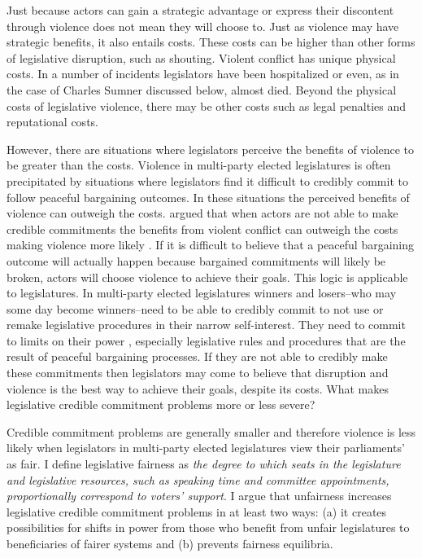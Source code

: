 \documentclass[a4paper]{article}\usepackage[]{graphicx}\usepackage[]{color}
\begin{document}
Just because actors can gain a strategic advantage or express their discontent through violence does not mean they will choose to. Just as violence may have strategic benefits, it also entails costs. These costs can be higher than other forms of legislative disruption, such as shouting. Violent conflict has unique physical costs. In a number of incidents legislators have been hospitalized or even, as in the case of Charles Sumner discussed below, almost died. Beyond the physical costs of legislative violence, there may be other costs such as legal penalties and reputational costs.

However, there are situations where legislators perceive the benefits of violence to be greater than the costs. Violence in multi-party elected legislatures is often precipitated by situations where legislators find it difficult to credibly commit to follow peaceful bargaining outcomes. In these situations the perceived benefits of violence can outweigh the costs. \cite{Fearon1995} argued that when actors are not able to make credible commitments the benefits from violent conflict can outweigh the costs making violence more likely \cite[see also][]{Powell2006}. If it is difficult to believe that a peaceful bargaining outcome will actually happen because bargained commitments will likely be broken, actors will choose violence to achieve their goals. This logic is applicable to legislatures. In multi-party elected legislatures winners and losers--who may some day become winners--need to be able to credibly commit to not use or remake legislative procedures in their narrow self-interest. They need to commit to limits on their power \citep{riker1982,Gaubatz1996}, especially legislative rules and procedures that are the result of peaceful bargaining processes. If they are not able to credibly make these commitments then legislators may come to believe that disruption and violence is the best way to achieve their goals, despite its costs. What makes legislative credible commitment problems more or less severe?

Credible commitment problems are generally smaller and therefore violence is less likely when legislators in multi-party elected legislatures view their parliaments' as fair. I define legislative fairness as \emph{the degree to which seats in the legislature and legislative resources, such as speaking time and committee appointments, proportionally correspond to voters' support}. I argue that unfairness increases legislative credible commitment problems in at least two ways: (a) it creates possibilities for shifts in power from those who benefit from unfair legislatures to beneficiaries of fairer systems and (b) prevents fairness equilibria.
\end{document}
